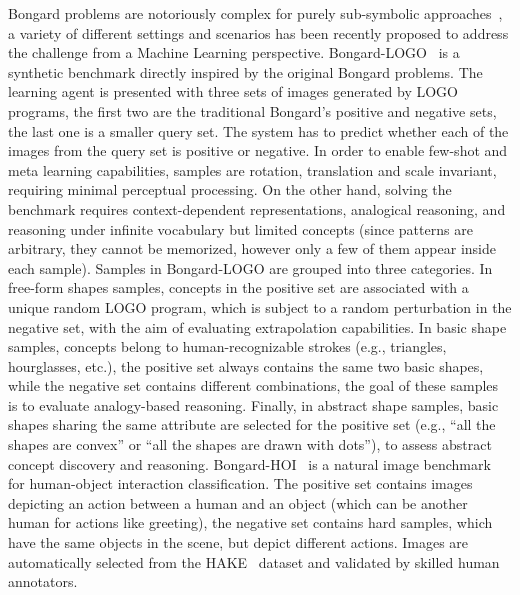 Bongard problems are notoriously complex for purely sub-symbolic approaches~\cite{yun2020deeper}, a variety of different settings and scenarios has been recently proposed to address the challenge from a Machine Learning perspective.
%
Bongard-LOGO~\cite{nie2020bongard} is a synthetic benchmark directly inspired by the original Bongard problems. %
The learning agent is presented with three sets of images generated by LOGO programs, the first two are the traditional Bongard's positive and negative sets, the last one is a smaller query set. The system has to predict whether each of the images from the query set is positive or negative.
In order to enable few-shot and meta learning capabilities, samples are rotation, translation and scale invariant, requiring minimal perceptual processing. On the other hand, solving the benchmark requires context-dependent representations, analogical reasoning, and reasoning under infinite vocabulary but limited concepts (since patterns are arbitrary, they cannot be memorized, however only a few of them appear inside each sample).
Samples in Bongard-LOGO are grouped into three categories.
In free-form shapes samples, concepts in the positive set are associated with a unique random LOGO program, which is subject to a random perturbation in the negative set, with the aim of evaluating extrapolation capabilities.
In basic shape samples, concepts belong to human-recognizable strokes (e.g., triangles, hourglasses, etc.), the positive set always contains the same two basic shapes, while the negative set contains different combinations, the goal of these samples is to evaluate analogy-based reasoning.
Finally, in abstract shape samples, basic shapes sharing the same attribute are selected for the positive set (e.g., ``all the shapes are convex'' or ``all the shapes are drawn with dots''), to assess abstract concept discovery and reasoning.
Bongard-HOI~\cite{jiang2022bongard} is a natural image benchmark for human-object interaction classification. %
The positive set contains images depicting an action between a human and an object (which can be another human for actions like greeting), the negative set contains hard samples, which have the same objects in the scene, but depict different actions.
Images are automatically selected from the HAKE~\cite{li2019hake} dataset and validated by skilled human annotators.
